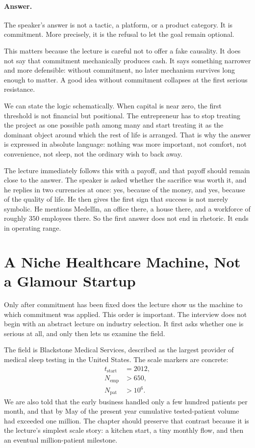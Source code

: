 \paragraph{Answer.} The speaker’s answer is not a tactic, a platform, or a product category. It is commitment. More precisely, it is the refusal to let the goal remain optional.

This matters because the lecture is careful not to offer a fake causality. It does not say that commitment mechanically produces cash. It says something narrower and more defensible: without commitment, no later mechanism survives long enough to matter. A good idea without commitment collapses at the first serious resistance.

We can state the logic schematically. When capital is near zero, the first threshold is not financial but positional. The entrepreneur has to stop treating the project as one possible path among many and start treating it as the dominant object around which the rest of life is arranged. That is why the answer is expressed in absolute language: nothing was more important, not comfort, not convenience, not sleep, not the ordinary wish to back away.

The lecture immediately follows this with a payoff, and that payoff should remain close to the answer. The speaker is asked whether the sacrifice was worth it, and he replies in two currencies at once: yes, because of the money, and yes, because of the quality of life. He then gives the first sign that success is not merely symbolic. He mentions Medell\'{\i}n, an office there, a house there, and a workforce of roughly \(350\) employees there. So the first answer does not end in rhetoric. It ends in operating range.

\section{A Niche Healthcare Machine, Not a Glamour Startup}

Only after commitment has been fixed does the lecture show us the machine to which commitment was applied. This order is important. The interview does not begin with an abstract lecture on industry selection. It first asks whether one is serious at all, and only then lets us examine the field.

The field is Blackstone Medical Services, described as the largest provider of medical sleep testing in the United States. The scale markers are concrete:
\begin{align}
t_{\text{start}} &= 2012, \\
N_{\text{emp}} &> 650, \\
N_{\text{pat}} &> 10^6.
\end{align}
We are also told that the early business handled only a few hundred patients per month, and that by May of the present year cumulative tested-patient volume had exceeded one million. The chapter should preserve that contrast because it is the lecture’s simplest scale story: a kitchen start, a tiny monthly flow, and then an eventual million-patient milestone.

